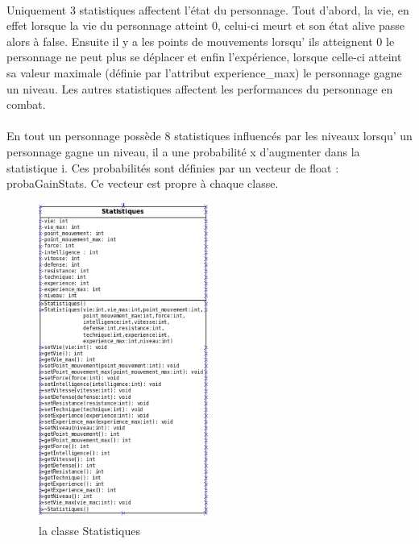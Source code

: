 \documentclass[a4paper,12pt]{article}
\begin{document}
\paragraph{} Uniquement 3 statistiques affectent l'état du personnage. Tout d'abord, la vie, en effet lorsque la vie du personnage atteint 0, celui-ci meurt et son état alive passe alors à false. Ensuite il y a les points de mouvements lorsqu' ils atteignent 0 le personnage ne peut plus se déplacer et enfin l'expérience, lorsque celle-ci atteint sa valeur maximale (définie par l'attribut experience\_max) le personnage gagne un niveau. Les autres statistiques affectent les performances du personnage en combat.
\paragraph{}En tout un personnage possède 8 statistiques influencés par les niveaux lorsqu' un personnage gagne un niveau, il a une probabilité x d'augmenter dans la statistique i. Ces probabilités sont définies par un vecteur de float : probaGainStats. Ce vecteur est propre à chaque classe.
\begin{figure}[ht]
\begin{center}
\includegraphics[width=0.5\textwidth]{statistiques.png}
\caption{\label{pacmangame}la classe Statistiques}
\end{center}
\end{figure}
\end{document}
